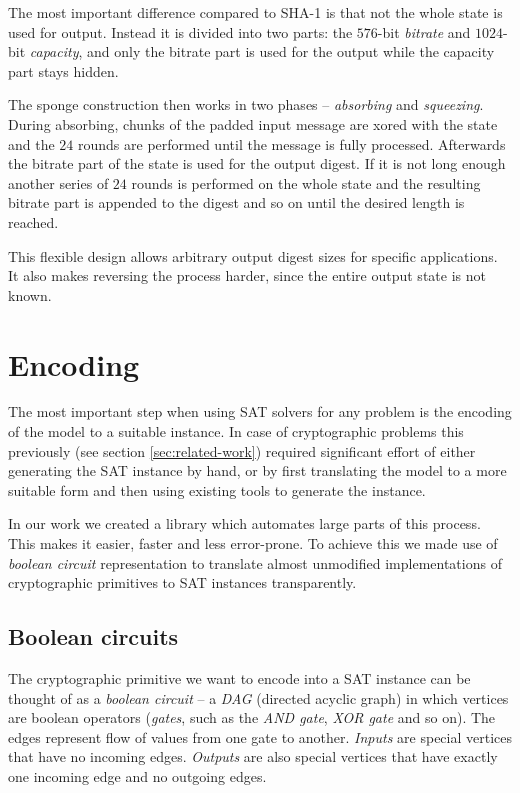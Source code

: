The most important difference compared to SHA-1 is that not the whole state is used for output.
Instead it is divided into two parts: the $576$-bit \emph{bitrate} and $1024$-bit \emph{capacity}, and only the bitrate part is used for the output while the capacity part stays hidden.

The sponge construction then works in two phases -- \emph{absorbing} and \emph{squeezing}.
During absorbing, chunks of the padded input message are xored with the state and the $24$ rounds are performed until the message is fully processed.
Afterwards the bitrate part of the state is used for the output digest.
If it is not long enough another series of $24$ rounds is performed on the whole state and the resulting bitrate part is appended to the digest and so on until the desired length is reached.

This flexible design allows arbitrary output digest sizes for specific applications.
It also makes reversing the process harder, since the entire output state is not known.

\section{Encoding}
The most important step when using SAT solvers for any problem is the encoding of the model to a suitable instance.
In case of cryptographic problems this previously (see section \ref{sec:related-work}) required significant effort of either generating the SAT instance by hand, or by first translating the model to a more suitable form and then using existing tools to generate the instance.

In our work we created a library \cite{papay2016code} which automates large parts of this process.
This makes it easier, faster and less error-prone.
To achieve this we made use of \emph{boolean circuit} representation to translate almost unmodified implementations of cryptographic primitives to SAT instances transparently.

\subsection{Boolean circuits}
The cryptographic primitive we want to encode into a SAT instance can be thought of as a \emph{boolean circuit} -- a \emph{DAG} (directed acyclic graph) in which vertices are boolean operators (\emph{gates}, such as the \emph{AND gate}, \emph{XOR gate} and so on).
The edges represent flow of values from one gate to another.
\emph{Inputs} are special vertices that have no incoming edges.
\emph{Outputs} are also special vertices that have exactly one incoming edge and no outgoing edges.

